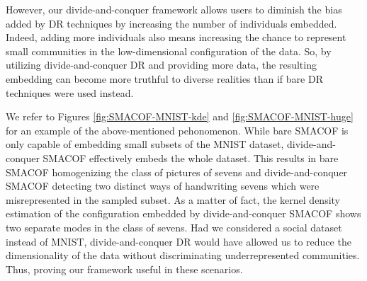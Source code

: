 However, our divide-and-conquer framework allows users to diminish the bias added by DR techniques by increasing the number of individuals embedded. Indeed, adding more individuals also means increasing the chance to represent small communities in the low-dimensional configuration of the data. So, by utilizing divide-and-conquer DR and providing more data, the resulting embedding can become more truthful to diverse realities than if bare DR techniques were used instead.

We refer to Figures \ref{fig:SMACOF-MNIST-kde} and \ref{fig:SMACOF-MNIST-huge} for an example of the above-mentioned pehonomenon. While bare SMACOF is only capable of embedding small subsets of the MNIST dataset, divide-and-conquer SMACOF effectively embeds the whole dataset. This results in bare SMACOF homogenizing the class of pictures of sevens and divide-and-conquer SMACOF detecting two distinct ways of handwriting sevens which were misrepresented in the sampled subset. As a matter of fact, the kernel density estimation of the configuration embedded by divide-and-conquer SMACOF shows two separate modes in the class of sevens. Had we considered a social dataset instead of MNIST, divide-and-conquer DR would have allowed us to reduce the dimensionality of the data without discriminating underrepresented communities. Thus, proving our framework useful in these scenarios.